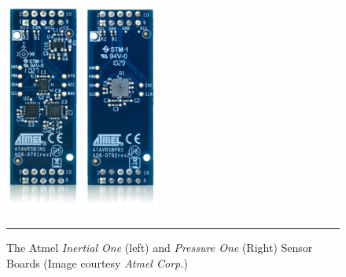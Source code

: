 \begin{figure}[h]
	\centering
		\includegraphics[height=70mm]{./Figures/Inertial1.jpg}
		\includegraphics[height=70mm]{./Figures/Pressure1.jpg}
	\rule{35em}{0.5pt}
	\caption[Atmel Sensor Boards]{The Atmel \emph{Inertial One} (left) and \emph{Pressure One} (Right) Sensor Boards (Image courtesy \textit{Atmel Corp.})}
	\label{fig:atmelsensorboards}
\end{figure}

